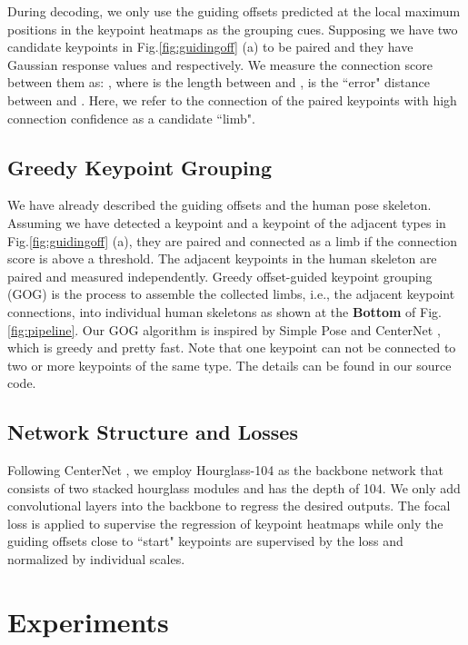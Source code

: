 \documentclass{article}
\begin{document}
During decoding, we only use the guiding offsets predicted at the local maximum  positions in the keypoint heatmaps as the grouping cues.  Supposing we have two candidate keypoints in Fig.\ref{fig:guidingoff} (a) to be paired and they have Gaussian response values  and  respectively. We measure the connection score between them as: , where  is the length between  and ,  is the ``error" distance between  and . Here, we refer to the connection of the paired keypoints with high connection confidence as a candidate ``limb".


\subsection{Greedy Keypoint Grouping}
We have already described the guiding offsets and the human pose skeleton. Assuming we have detected a keypoint  and a keypoint  of the adjacent types in Fig.\ref{fig:guidingoff} (a), they are paired and connected as a limb if the connection score  is above a threshold. The adjacent keypoints in the human skeleton are paired and measured independently.
Greedy offset-guided keypoint grouping (GOG) is the process to assemble the collected limbs, i.e., the adjacent keypoint connections, into individual human skeletons as shown at the \textbf{Bottom} of Fig.\ref{fig:pipeline}.
Our GOG algorithm is inspired by Simple Pose \cite{li2020simple} and CenterNet \cite{Zhou:2019ta}, which is greedy and pretty fast.
Note that one keypoint can not be connected to two or more keypoints of the same type.  The details can be found in our source code.


\subsection{Network Structure and Losses}
Following CenterNet \cite{Zhou:2019ta}, we employ Hourglass-104 as the backbone network that consists of two stacked hourglass modules \cite{Newell2016Stacked} and has the depth of 104. We only add  convolutional layers into the backbone to regress the desired outputs. The focal  loss \cite{li2020simple} is applied to supervise the regression of keypoint heatmaps while only the guiding offsets close to ``start" keypoints are supervised by the  loss and normalized by individual scales. 







\section{Experiments}
\end{document}
